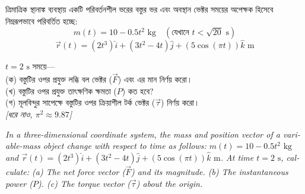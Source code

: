 \documentclass[12pt, a4paper]{article}
\begin{document}
\begin{tcolorbox}[questionbox={প্রশ্ন (Question) 2}]
\noindent
ত্রিমাত্রিক স্থানাঙ্ক ব্যবস্থায় একটি পরিবর্তনশীল ভরের বস্তুর ভর এবং অবস্থান ভেক্টর সময়ের অপেক্ষক হিসেবে নিম্নরূপভাবে পরিবর্তিত হচ্ছে:
$$m(t) = 10 - 0.5t^2 \text{ kg} \quad (\text{যেখানে } t < \sqrt{20}\text{ s})$$
$$\vec{r}(t) = (2t^3)\hat{i} + (3t^2 - 4t)\hat{j} + (5\cos(\pi t))\hat{k} \text{ m}$$

\vspace{0.3em}
\noindent
$t = 2\text{ s}$ সময়ে— \\
(ক) বস্তুটির ওপর প্রযুক্ত লব্ধি বল ভেক্টর ($\vec{F}$) এবং এর মান নির্ণয় করো। \\
(খ) বস্তুটির ওপর প্রযুক্ত তাৎক্ষণিক ক্ষমতা ($P$) কত হবে? \\
(গ) মূলবিন্দুর সাপেক্ষে বস্তুটির ওপর ক্রিয়াশীল টর্ক ভেক্টর ($\vec{\tau}$) নির্ণয় করো। \\
\textit{[ধরে নাও, $\pi^2 \approx 9.87$]}

\vspace{0.8em}
\begin{english}
\noindent\textit{\color{darkgray}
In a three-dimensional coordinate system, the mass and position vector of a variable-mass object change with respect to time as follows: $m(t) = 10 - 0.5t^2 \text{ kg}$ and $\vec{r}(t) = (2t^3)\hat{i} + (3t^2 - 4t)\hat{j} + (5\cos(\pi t))\hat{k} \text{ m}$. At time $t = 2\text{ s}$, calculate: (a) The net force vector ($\vec{F}$) and its magnitude. (b) The instantaneous power ($P$). (c) The torque vector ($\vec{\tau}$) about the origin.
}
\end{english}
\end{tcolorbox}
\end{document}
